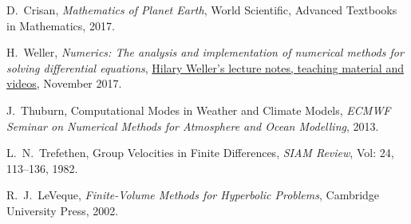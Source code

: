 \begin{thebibliography}{9999}

D.~Crisan, \emph{Mathematics of Planet Earth}, World Scientific, Advanced Textbooks in Mathematics, 2017.

H.~Weller, \emph{Numerics: The analysis and implementation of numerical methods for solving differential equations}, \href{http://www.met.reading.ac.uk/~sws02hs/teaching/}{Hilary Weller's lecture notes, teaching material and videos}, November 2017.

J.~Thuburn, Computational Modes in Weather and Climate Models, \emph{ECMWF Seminar on Numerical Methods for Atmosphere and Ocean Modelling}, 2013.

L.~N.~Trefethen, Group Velocities in Finite Differences, \emph{SIAM Review}, Vol: 24, 113--136, 1982.

R.~J.~LeVeque, \emph{Finite-Volume Methods for Hyperbolic Problems}, Cambridge University Press, 2002.

\end{thebibliography} 